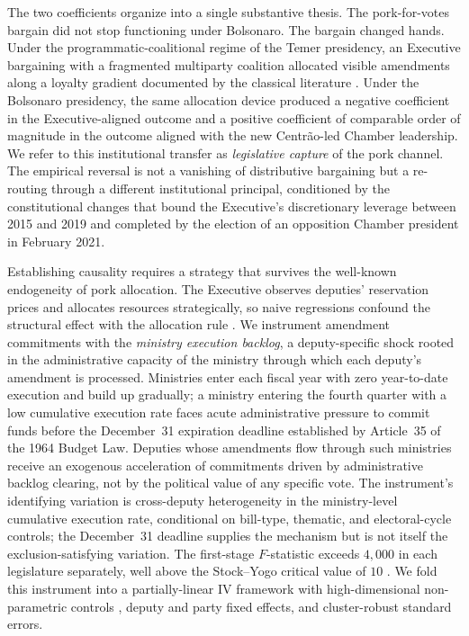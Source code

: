 \documentclass[pdflatex,sn-basic]{sn-jnl}
\begin{document}
The two coefficients organize into a single substantive thesis. The pork-for-votes bargain did not stop functioning under Bolsonaro. The bargain changed hands. Under the programmatic-coalitional regime of the Temer presidency, an Executive bargaining with a fragmented multiparty coalition allocated visible amendments along a loyalty gradient documented by the classical literature \citep{PereiraAndMueller2004,Raile2011}. Under the Bolsonaro presidency, the same allocation device produced a negative coefficient in the Executive-aligned outcome and a positive coefficient of comparable order of magnitude in the outcome aligned with the new Centr\~ao-led Chamber leadership. We refer to this institutional transfer as \emph{legislative capture} of the pork channel. The empirical reversal is not a vanishing of distributive bargaining but a re-routing through a different institutional principal, conditioned by the constitutional changes that bound the Executive's discretionary leverage between 2015 and 2019 and completed by the election of an opposition Chamber president in February 2021.

Establishing causality requires a strategy that survives the well-known endogeneity of pork allocation. The Executive observes deputies' reservation prices and allocates resources strategically, so naive regressions confound the structural effect with the allocation rule \citep{BerryGrosscloseMilyo2000,DesposatoCOE2006}. We instrument amendment commitments with the \emph{ministry execution backlog}, a deputy-specific shock rooted in the administrative capacity of the ministry through which each deputy's amendment is processed. Ministries enter each fiscal year with zero year-to-date execution and build up gradually; a ministry entering the fourth quarter with a low cumulative execution rate faces acute administrative pressure to commit funds before the December~31 expiration deadline established by Article~35 of the 1964 Budget Law. Deputies whose amendments flow through such ministries receive an exogenous acceleration of commitments driven by administrative backlog clearing, not by the political value of any specific vote. The instrument's identifying variation is cross-deputy heterogeneity in the ministry-level cumulative execution rate, conditional on bill-type, thematic, and electoral-cycle controls; the December~31 deadline supplies the mechanism but is not itself the exclusion-satisfying variation. The first-stage $F$-statistic exceeds $4{,}000$ in each legislature separately, well above the Stock--Yogo critical value of $10$ \citep{StockYogo2005}. We fold this instrument into a partially-linear IV framework with high-dimensional non-parametric controls \citep{Chernozhukov2018}, deputy and party fixed effects, and cluster-robust standard errors.
\end{document}
